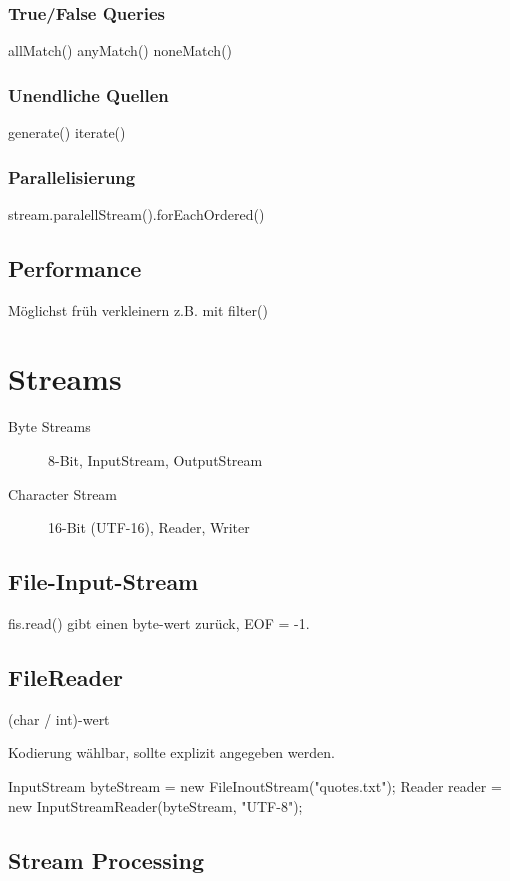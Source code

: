 {		\subsubsection{True/False Queries}
		allMatch()
		anyMatch()
		noneMatch()
	
		\subsubsection{Unendliche Quellen}
		generate()
		iterate()
			
		
		\subsubsection{Parallelisierung}	
		stream.paralellStream().forEachOrdered()
	\subsection{Performance}
	
	Möglichst früh verkleinern z.B. mit filter()

\section{Streams}
	\begin{description}
	\item[Byte Streams] \hfill
		8-Bit, InputStream, OutputStream
	
	\item[Character Stream] \hfill
		16-Bit (UTF-16), Reader, Writer
	\end{description}
	
	\subsection{File-Input-Stream}
	
		fis.read() gibt einen byte-wert zurück, EOF = -1.
		
	\subsection{FileReader}
	
	(char / int)-wert
	
	Kodierung wählbar, sollte explizit angegeben werden.
	
	InputStream byteStream = new FileInoutStream("quotes.txt");
	Reader reader = new InputStreamReader(byteStream, "UTF-8");
	
	\subsection{Stream Processing}
	
}
